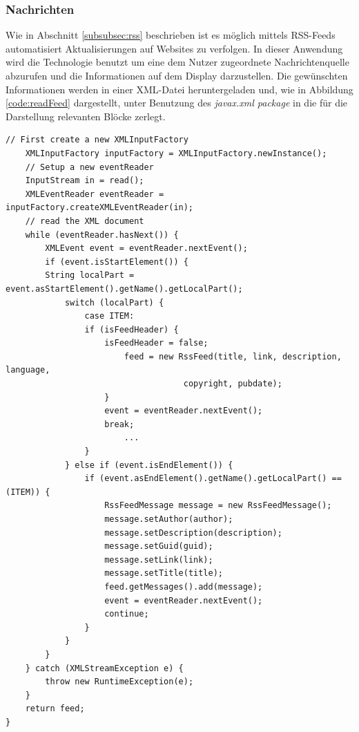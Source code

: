 \subsubsection{Nachrichten}
\label{subsubsec:news}

Wie in Abschnitt \ref{subsubsec:rss} beschrieben ist es möglich mittels RSS-Feeds automatisiert Aktualisierungen auf Websites zu verfolgen. In dieser Anwendung wird die Technologie benutzt um eine dem Nutzer zugeordnete Nachrichtenquelle abzurufen und die Informationen auf dem Display darzustellen. Die gewünschten Informationen werden in einer XML-Datei heruntergeladen und, wie in Abbildung \ref{code:readFeed} dargestellt, unter Benutzung des \textit{javax.xml package} in die für die Darstellung relevanten Blöcke zerlegt.

\begin{lstlisting}[float=htb,caption={RRSFeedParser Klasse - Auslesen der Informationen aus empfangenem XML Dokument},label=code:readFeed]
	// First create a new XMLInputFactory
   	XMLInputFactory inputFactory = XMLInputFactory.newInstance();
    // Setup a new eventReader
    InputStream in = read();
    XMLEventReader eventReader = inputFactory.createXMLEventReader(in);
    // read the XML document
    while (eventReader.hasNext()) {
    	XMLEvent event = eventReader.nextEvent();
        if (event.isStartElement()) {
        String localPart = event.asStartElement().getName().getLocalPart();
        	switch (localPart) {
                case ITEM:
            	if (isFeedHeader) {
                 	isFeedHeader = false;
                       	feed = new RssFeed(title, link, description, language,
                                    copyright, pubdate);
                  	}
                    event = eventReader.nextEvent();
                    break;
                		...
            	}
           	} else if (event.isEndElement()) {
            	if (event.asEndElement().getName().getLocalPart() == (ITEM)) {
                    RssFeedMessage message = new RssFeedMessage();
                    message.setAuthor(author);
                    message.setDescription(description);
                    message.setGuid(guid);
                    message.setLink(link);
                    message.setTitle(title);
                    feed.getMessages().add(message);
                    event = eventReader.nextEvent();
                	continue;
            	}
            }
        }
    } catch (XMLStreamException e) {
		throw new RuntimeException(e);
    }
    return feed;
}
\end{lstlisting}

